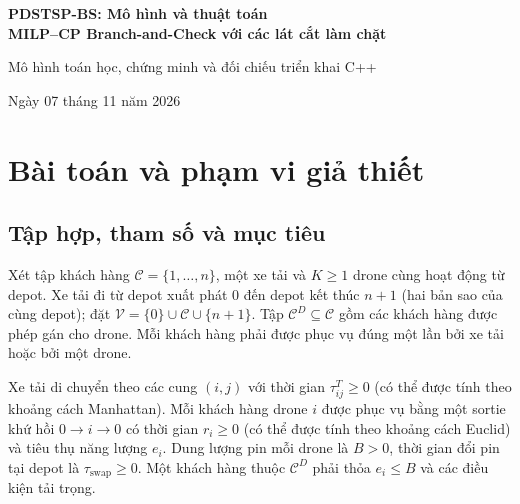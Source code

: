 \documentclass[11pt,a4paper]{article}
\theoremstyle{definition}
\theoremstyle{plain}
\theoremstyle{remark}
\newcommand{\C}{\mathcal C}
\newcommand{\CD}{\mathcal C^D}
\newcommand{\V}{\mathcal V}
\newcommand{\sw}{\tau_{\mathrm{swap}}}
\begin{document}
\begin{center}
{\sffamily\color{navy}\Large\bfseries PDSTSP-BS: Mô hình và thuật toán\\[3pt]
MILP--CP Branch-and-Check với các lát cắt làm chặt}\par
\vspace{6pt}
{\large\sffamily Mô hình toán học, chứng minh và đối chiếu triển khai C++}\par
\vspace{5pt}
{\small Ngày 07 tháng 11 năm 2026}\par
\end{center}
\vspace{5pt}
\begin{abstract}
Tài liệu trình bày một khung phân rã MILP--CP cho bài toán \emph{Parallel Drone Scheduling Traveling Salesman Problem with Battery Swapping} (PDSTSP-BS). Trọng tâm là các kết quả có thể chứng minh dưới những giả thiết vận hành được nêu tường minh: tính khả thi của mọi tập khách hàng đủ điều kiện phục vụ bằng drone, các cận dưới an toàn của Master, tính đơn điệu của hàm makespan drone, bất đẳng thức chặn mức thay đổi khi bổ sung khách hàng và lát cắt tối ưu \emph{logic-based Benders} không cần hằng số Big-$M$ tùy ý. Tài liệu cũng phân biệt cận dưới được chứng nhận với nghiệm khả thi của CP-SAT, đưa ra điều kiện cần để cơ chế Branch-and-Check giữ tính chính xác, cùng một đoạn mã Gurobi C++ minh họa. Không đưa vào các feasibility cuts hay các phát biểu về hiệu năng chưa có chứng minh hoặc kiểm chứng.
\end{abstract}

\begingroup
\small
\setlength{\parskip}{0pt}
\tableofcontents
\endgroup
\newpage

\section{Bài toán và phạm vi giả thiết}
\subsection{Tập hợp, tham số và mục tiêu}
Xét tập khách hàng $\C=\{1,\ldots,n\}$, một xe tải và $K\ge1$ drone cùng hoạt động từ depot. Xe tải đi từ depot xuất phát $0$ đến depot kết thúc $n+1$ (hai bản sao của cùng depot); đặt $\V=\{0\}\cup\C\cup\{n+1\}$. Tập $\CD\subseteq\C$ gồm các khách hàng được phép gán cho drone. Mỗi khách hàng phải được phục vụ đúng một lần bởi xe tải hoặc bởi một drone.

Xe tải di chuyển theo các cung $(i,j)$ với thời gian $\tau^T_{ij}\ge0$ (có thể được tính theo khoảng cách Manhattan). Mỗi khách hàng drone $i$ được phục vụ bằng một sortie khứ hồi $0\to i\to0$ có thời gian $r_i\ge0$ (có thể được tính theo khoảng cách Euclid) và tiêu thụ năng lượng $e_i$. Dung lượng pin mỗi drone là $B>0$, thời gian đổi pin tại depot là $\sw\ge0$. Một khách hàng thuộc $\CD$ phải thỏa $e_i\le B$ và các điều kiện tải trọng.
\end{document}
